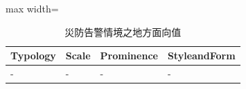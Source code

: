 \begin{table}[htbp]
\centering
\caption{災防告警情境之地方面向值}
\label{tab:disasterQuality}
\begin{adjustbox}{max width=\textwidth}
\renewcommand{\arraystretch}{1.4}
\begin{tabular}{>{\centering\arraybackslash}m{4cm} >{\centering\arraybackslash}m{4cm} >{\centering\arraybackslash}m{4cm} >{\centering\arraybackslash}m{5cm}}
\toprule
Typology & Scale & Prominence & StyleandForm \\ 
\toprule
- & - & - & - \\ \midrule
\bottomrule
\end{tabular}
\end{adjustbox}
\end{table}